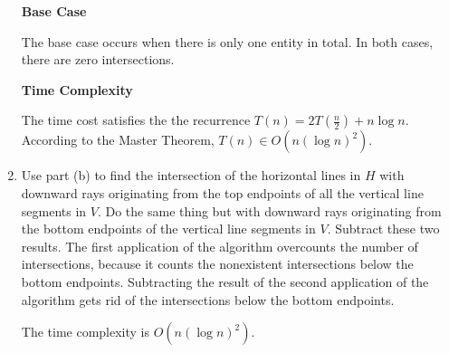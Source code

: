 \documentclass{article}
\begin{document}
\begin{solution}
\begin{enumerate}[label = (\alph*)]
    \textbf{Base Case}

    The base case occurs when there is only one entity in total. 
    In both cases, there are zero intersections.

    \textbf{Time Complexity}

    The time cost satisfies the the recurrence $T(n)=2T(\frac{n}{2}) + n\log n$.
    According to the Master Theorem, $T(n)\in O(n(\log n)^2)$.


    \item 
    Use part (b) to find the intersection of the horizontal lines in $H$ with downward rays originating from the top endpoints of all the vertical line segments in $V$.
    Do the same thing but with downward rays originating from the bottom endpoints of the vertical line segments in $V$. Subtract these two results.
    The first application of the algorithm overcounts the number of intersections, because it counts the 
    nonexistent intersections below the bottom endpoints. Subtracting the result of the 
    second application of the algorithm gets rid of the intersections below the bottom endpoints.

    The time complexity is $O(n(\log n)^2)$.

\end{enumerate}
\end{solution}
\end{document}
